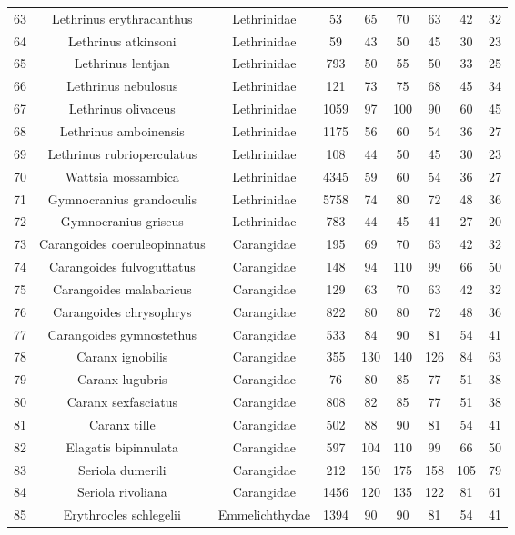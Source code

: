 \documentclass{report}\usepackage[]{graphicx}\usepackage[]{color}
\begin{document}
{\begin{longtable}{ccccccccc}
  63 & Lethrinus erythracanthus & Lethrinidae & 53 & 65 & 70 & 63 & 42 & 32 \\ 
  64 & Lethrinus atkinsoni & Lethrinidae & 59 & 43 & 50 & 45 & 30 & 23 \\ 
  65 & Lethrinus lentjan & Lethrinidae & 793 & 50 & 55 & 50 & 33 & 25 \\ 
  66 & Lethrinus nebulosus & Lethrinidae & 121 & 73 & 75 & 68 & 45 & 34 \\ 
  67 & Lethrinus olivaceus & Lethrinidae & 1059 & 97 & 100 & 90 & 60 & 45 \\ 
  68 & Lethrinus amboinensis & Lethrinidae & 1175 & 56 & 60 & 54 & 36 & 27 \\ 
  69 & Lethrinus rubrioperculatus & Lethrinidae & 108 & 44 & 50 & 45 & 30 & 23 \\ 
  70 & Wattsia mossambica & Lethrinidae & 4345 & 59 & 60 & 54 & 36 & 27 \\ 
  71 & Gymnocranius grandoculis & Lethrinidae & 5758 & 74 & 80 & 72 & 48 & 36 \\ 
  72 & Gymnocranius griseus & Lethrinidae & 783 & 44 & 45 & 41 & 27 & 20 \\ 
  73 & Carangoides coeruleopinnatus & Carangidae & 195 & 69 & 70 & 63 & 42 & 32 \\ 
  74 & Carangoides fulvoguttatus & Carangidae & 148 & 94 & 110 & 99 & 66 & 50 \\ 
  75 & Carangoides malabaricus & Carangidae & 129 & 63 & 70 & 63 & 42 & 32 \\ 
  76 & Carangoides chrysophrys & Carangidae & 822 & 80 & 80 & 72 & 48 & 36 \\ 
  77 & Carangoides gymnostethus & Carangidae & 533 & 84 & 90 & 81 & 54 & 41 \\ 
  78 & Caranx ignobilis & Carangidae & 355 & 130 & 140 & 126 & 84 & 63 \\ 
  79 & Caranx lugubris & Carangidae & 76 & 80 & 85 & 77 & 51 & 38 \\ 
  80 & Caranx sexfasciatus & Carangidae & 808 & 82 & 85 & 77 & 51 & 38 \\ 
  81 & Caranx tille & Carangidae & 502 & 88 & 90 & 81 & 54 & 41 \\ 
  82 & Elagatis bipinnulata & Carangidae & 597 & 104 & 110 & 99 & 66 & 50 \\ 
  83 & Seriola dumerili & Carangidae & 212 & 150 & 175 & 158 & 105 & 79 \\ 
  84 & Seriola rivoliana & Carangidae & 1456 & 120 & 135 & 122 & 81 & 61 \\ 
  85 & Erythrocles schlegelii & Emmelichthydae & 1394 & 90 & 90 & 81 & 54 & 41 \\ 

\end{longtable}}
\end{document}
